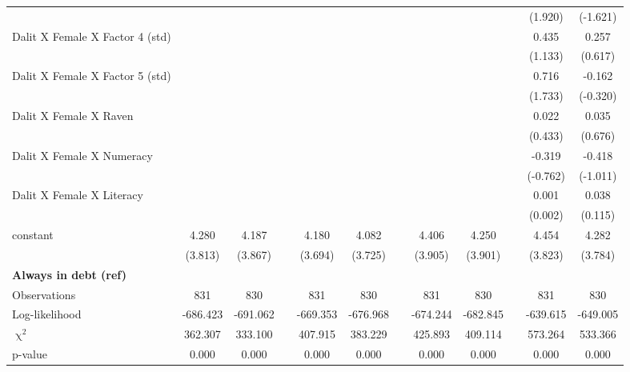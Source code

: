 {\begin{longtable}{@{\extracolsep{\fill}}lccccccccccc}
      &   &   &   &   &   &   &   &   &   & (1.920) & (-1.621) \\
    Dalit X Female X Factor 4 (std) &   &   &   &   &   &   &   &   &   & 0.435 & 0.257 \\
      &   &   &   &   &   &   &   &   &   & (1.133) & (0.617) \\
    Dalit X Female X Factor 5 (std) &   &   &   &   &   &   &   &   &   & 0.716 & -0.162 \\
      &   &   &   &   &   &   &   &   &   & (1.733) & (-0.320) \\
    Dalit X Female X Raven &   &   &   &   &   &   &   &   &   & 0.022 & 0.035 \\
      &   &   &   &   &   &   &   &   &   & (0.433) & (0.676) \\
    Dalit X Female X Numeracy &   &   &   &   &   &   &   &   &   & -0.319 & -0.418 \\
      &   &   &   &   &   &   &   &   &   & (-0.762) & (-1.011) \\
    Dalit X Female X Literacy &   &   &   &   &   &   &   &   &   & 0.001 & 0.038 \\
      &   &   &   &   &   &   &   &   &   & (0.002) & (0.115) \\
    constant & 4.280 & 4.187 &   & 4.180 & 4.082 &   & 4.406 & 4.250 &   & 4.454 & 4.282 \\
      & (3.813) & (3.867) &   & (3.694) & (3.725) &   & (3.905) & (3.901) &   & (3.823) & (3.784) \\
    \midrule
    \textbf{Always in debt (ref)} &   &   &   &   &   &   &   &   &   &   &  \\
    \midrule
    Observations & 831 & 830 &   & 831 & 830 &   & 831 & 830 &   & 831 & 830 \\
    Log-likelihood & -686.423 & -691.062 &   & -669.353 & -676.968 &   & -674.244 & -682.845 &   & -639.615 & -649.005 \\
    $\upchi^2$ & 362.307 & 333.100 &   & 407.915 & 383.229 &   & 425.893 & 409.114 &   & 573.264 & 533.366 \\
    p-value & 0.000 & 0.000 &   & 0.000 & 0.000 &   & 0.000 & 0.000 &   & 0.000 & 0.000 \\
    \bottomrule
    \end{longtable}%
}